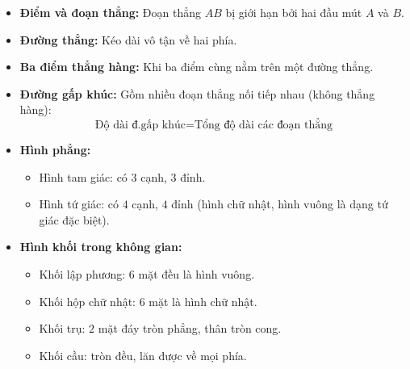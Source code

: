 \documentclass[10pt,a4paper]{article}
\begin{document}
\noindent
\begin{minipage}[t]{0.49\textwidth}\vspace{0pt}
\begin{tcolorbox}[
  enhanced,
  colback=violet!4!white,
  colframe=violet!75!black,
  arc=2mm, boxrule=0.8pt,
  left=2mm, right=2mm, top=1.8mm, bottom=1.8mm,
  title={\footnotesize\bfseries\color{white}\faKey\ 1. Điểm, đoạn thẳng, đường gấp khúc}
]
{\footnotesize
\begin{itemize}\setlength{\itemsep}{1pt}\setlength{\leftskip}{-2.5mm}
  \item \textbf{Điểm và đoạn thẳng:} Đoạn thẳng $AB$ bị giới hạn bởi hai đầu mút $A$ và $B$.
  \item \textbf{Đường thẳng:} Kéo dài vô tận về hai phía.
  \item \textbf{Ba điểm thẳng hàng:} Khi ba điểm cùng nằm trên một đường thẳng.
  \item \textbf{Đường gấp khúc:} Gồm nhiều đoạn thẳng nối tiếp nhau (không thẳng hàng):
  $$\text{Độ dài đ.gấp khúc} = \text{Tổng độ dài các đoạn thẳng}$$
\end{itemize}
}
\end{tcolorbox}
\end{minipage}
\hfill
\begin{minipage}[t]{0.49\textwidth}\vspace{0pt}
\begin{tcolorbox}[
  enhanced,
  colback=teal!4!white,
  colframe=teal!75!black,
  arc=2mm, boxrule=0.8pt,
  left=2mm, right=2mm, top=1.8mm, bottom=1.8mm,
  title={\footnotesize\bfseries\color{white}\faSliders\ 2. Hình phẳng và Hình khối}
]
{\footnotesize
\begin{itemize}\setlength{\itemsep}{1pt}\setlength{\leftskip}{-2.5mm}
  \item \textbf{Hình phẳng:}
  \begin{itemize}\setlength{\itemsep}{0.5pt}\setlength{\leftskip}{-2mm}
    \item Hình tam giác: có $3$ cạnh, $3$ đỉnh.
    \item Hình tứ giác: có $4$ cạnh, $4$ đỉnh (hình chữ nhật, hình vuông là dạng tứ giác đặc biệt).
  \end{itemize}
  \item \textbf{Hình khối trong không gian:}
  \begin{itemize}\setlength{\itemsep}{0.5pt}\setlength{\leftskip}{-2mm}
    \item Khối lập phương: $6$ mặt đều là hình vuông.
    \item Khối hộp chữ nhật: $6$ mặt là hình chữ nhật.
    \item Khối trụ: $2$ mặt đáy tròn phẳng, thân tròn cong.
    \item Khối cầu: tròn đều, lăn được về mọi phía.
  \end{itemize}
\end{itemize}
}
\end{tcolorbox}
\end{minipage}
\end{document}
